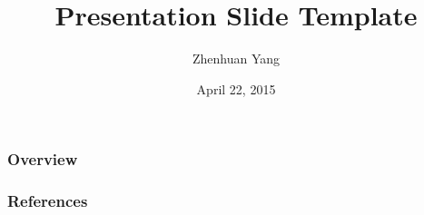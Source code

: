 \documentclass{beamer}
\title[Presentation]{Presentation Slide Template}
\author[ZY]{Zhenhuan Yang}
\institute[UAlbany]{Department of Mathematics \& Statistics\\University at Albany, SUNY}
\date{April 22, 2015}
\theoremstyle{mystyle}
\begin{document}
% 


\begin{frame}
	\titlepage
\end{frame}


\begin{frame}
	\frametitle{Overview}
	\tableofcontents
\end{frame}

% 

% 

% 

% 

% 

\begin{frame}[allowframebreaks]
	\frametitle{References}
	
	{\footnotesize
	}
\end{frame}
\end{document}
